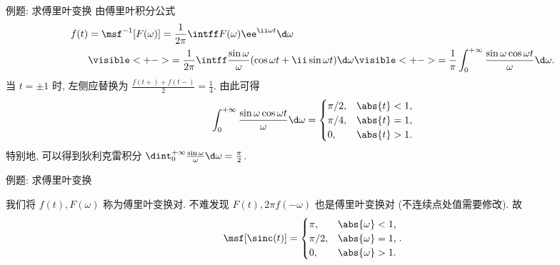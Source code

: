 \begin{frame}{例题: 求傅里叶变换}
	\onslide<+->
	由傅里叶积分公式
	\begin{align*}
		f(t)&=\msf^{-1}[F(\omega)]=\frac1{2\pi}\intff F(\omega)\ee^{\ii \omega t}\d\omega\\
		&\visible<+->{=\frac1{2\pi}\intff \frac{\sin\omega}{\omega}(\cos\omega t+\ii \sin\omega t)\d \omega}
		\visible<+->{=\frac1\pi\int_0^{+\infty}\frac{\sin\omega\cos\omega t}{\omega}\d \omega.}
	\end{align*}
	\onslide<+->
	当 $t=\pm1$ 时, 左侧应替换为 $\frac{f(t+)+f(t-)}2=\frac14$.
	\onslide<+->
	由此可得
	\[
		\int_0^{+\infty}\frac{\sin \omega\cos\omega t}\omega\d\omega=\begin{cases}
		\pi/2,&\abs{t}<1,\\
		\pi/4,&\abs{t}=1,\\
		0,&\abs{t}>1.
	\end{cases}
	\]
	\onslide<+->
	特别地, 可以得到狄利克雷积分
	$\dint_0^{+\infty}\frac{\sin\omega}\omega\d\omega=\frac\pi2$.
\end{frame}


\begin{frame}{例题: 求傅里叶变换}
	\onslide<+->
	\begin{center}
	\end{center}
	\onslide<+->
	我们将 $f(t),F(\omega)$ 称为傅里叶变换对.
	\onslide<+->
	不难发现 $F(t),2\pi f(-\omega)$ 也是傅里叶变换对 (不连续点处值需要修改).
	\onslide<+->
	故
	\[
		\msf[\sinc(t)]=\begin{cases}
		\pi,&\abs{\omega}<1,\\
		\pi/2,&\abs{\omega}=1,\\
		0,&\abs{\omega}>1.
		\end{cases}.
	\]
\end{frame}


